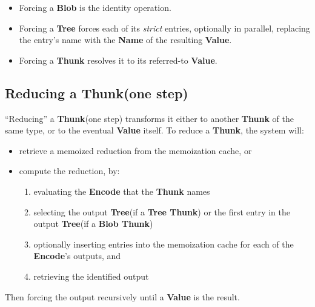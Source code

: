 \documentclass{article}
\newcommand{\blob}{\textbf{Blob}\xspace}
\newcommand{\valuex}{\textbf{Value}\xspace}
\newcommand{\encode}{\textbf{Encode}\xspace}
\newcommand{\thunk}{\textbf{Thunk}\xspace}
\newcommand{\blobthunk}{\textbf{Blob Thunk}\xspace}
\newcommand{\treethunk}{\textbf{Tree Thunk}\xspace}
\newcommand{\name}{\textbf{Name}\xspace}
\newcommand{\tree}{\textbf{Tree}\xspace}
\begin{document}
\begin{itemize}[itemsep=0pt]
\item Forcing a \blob is the identity operation.

\item Forcing a \tree forces each of its \emph{strict} entries, optionally in
  parallel, replacing the entry's name with the \name of the resulting \valuex.

\item Forcing a \thunk resolves it to its referred-to \valuex.
\end{itemize}

\subsection{Reducing a \thunk (one step)}

``Reducing'' a \thunk (one step) transforms it either to another \thunk of the same type, or to the eventual \valuex itself. To reduce a \thunk, the system will:
\begin{itemize}[itemsep=0pt]
\item retrieve a memoized reduction from the memoization cache, or
\item compute the reduction, by:
  \begin{enumerate}[itemsep=0pt]
  \item evaluating the \encode that the \thunk names
  \item selecting the output \tree (if a \treethunk) or the first entry in the output \tree (if a \blobthunk)

  \item optionally inserting entries into the memoization cache for each of the \encode's outputs, and
  \item retrieving the identified output
  \end{enumerate}
\end{itemize}

Then forcing the output recursively until a \valuex is the result.
\end{document}
